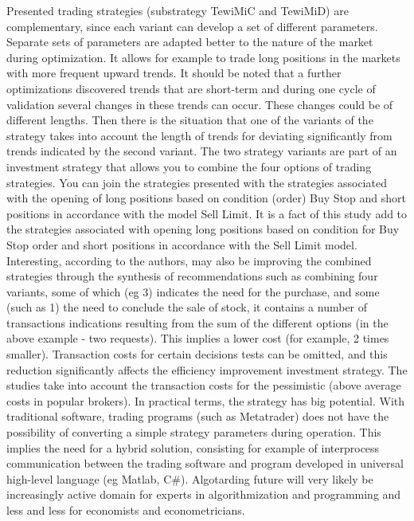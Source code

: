 \documentclass{tewiart}
\begin{document}
Presented trading strategies (substrategy TewiMiC and TewiMiD) are complementary, since each variant can develop a set of different parameters. Separate sets of parameters are adapted better to the nature of the market during optimization. It allows for example to trade long positions in the markets with more frequent upward trends. It should be noted that a further optimizations discovered trends that are short-term and during one cycle of validation several changes in these trends can occur. These changes could be of different lengths. Then there is the situation that one of the variants of the strategy takes into account the length of trends for deviating significantly from trends indicated by the second variant. The two strategy variants are part of an investment strategy that allows you to combine the four options of trading strategies. You can join the strategies presented with the strategies associated with the opening of long positions based on condition (order) Buy Stop and short positions in accordance with the model Sell Limit. It is a fact of this study add to the strategies associated with opening long positions based on condition for Buy Stop order and short positions in accordance with the Sell Limit model. Interesting, according to the authors, may also be improving the combined strategies through the synthesis of recommendations such as combining four variants, some of which (eg 3) indicates the need for the purchase, and some (such as 1) the need to conclude the sale of stock, it contains a number of transactions indications resulting from the sum of the different options (in the above example - two requests). This implies a lower cost (for example, 2 times smaller). Transaction costs for certain decisions tests can be omitted, and this reduction significantly affects the efficiency improvement investment strategy. The studies take into account the transaction costs for the pessimistic (above average costs in popular brokers). In practical terms, the strategy has big potential. With traditional software, trading programs (such as Metatrader) does not have the possibility of converting a simple strategy parameters during operation. This implies the need for a hybrid solution, consisting for example of interprocess communication between the trading software and program developed in universal high-level language (eg Matlab, C\#). Algotarding future will very likely be increasingly active domain for experts in algorithmization and programming and less and less for economists and econometricians.\\
\end{document}
